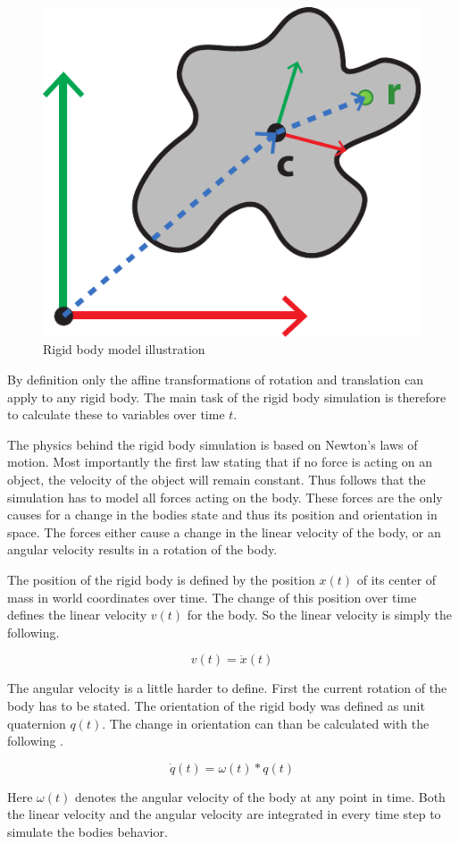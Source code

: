 \begin{figure}[htb]
\centering
\includegraphics[width=.4\textwidth]{images/rigid_body_1.pdf}
\caption{Rigid body model illustration}
\label{img:rigid_body}
\end{figure}

By definition only the affine transformations of rotation and translation can apply to any rigid body. The main task of the rigid body simulation is therefore to calculate these to variables over time \(t\).

The physics behind the rigid body simulation is based on Newton's laws of motion. Most importantly the first law stating that if no force is acting on an object, the velocity of the object will remain constant. Thus follows that the simulation has to model all forces acting on the body. These forces are the only causes for a change in the bodies state and thus its position and orientation in space. The forces either cause a change in the linear velocity of the body, or an angular velocity results in a rotation of the body. 

The position of the rigid body is defined by the position $x(t)$ of its center of mass in world coordinates over time. The change of this position over time defines the linear velocity $v(t)$ for the body. So the linear velocity is simply the following.

\begin{equation}
v(t) = \dot{x}(t)
\end{equation}

The angular velocity is a little harder to define. First the current rotation of the body has to be stated. The orientation of the rigid body was defined as unit quaternion $q(t)$. The change in orientation can than be calculated with the following .

\begin{equation}
\dot{q}(t) = \omega(t) * q(t)
\end{equation}

Here $\omega(t)$ denotes the angular velocity of the body at any point in time. Both the linear velocity and the angular velocity are integrated in every time step to simulate the bodies behavior.

